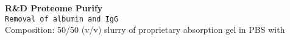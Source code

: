 \textbf{R&D Proteome Purify} 
\\
\texttt{Removal of albumin and IgG}
\\
Composition: 50/50 (v/v) slurry of proprietary absorption gel in PBS with 
